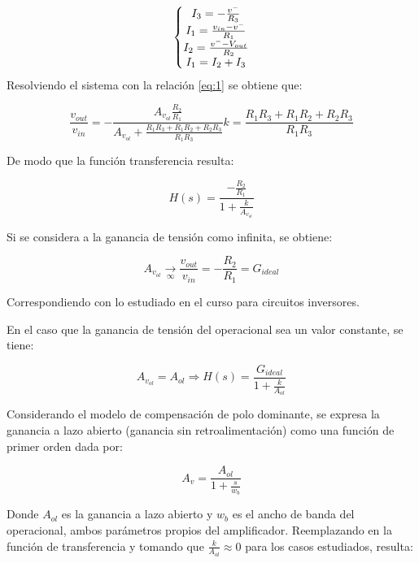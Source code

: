 \begin{equation}
\left\{\begin{matrix}

	$$I_{3}=-\frac{v^{-}}{R_{3}}$$
	
	\\ 
	$$I_{1}=\frac{v_{in}-v^{-}}{R_{1}}$$
	
	\\ 
	
	$$I_{2}=\frac{v^{-}-V_{out}}{R_{2}}$$
	
	\\ 
	
	$$I_{1}=I_{2}+I_{3}$$
	
	\end{matrix}\right.
\end{equation}
Resolviendo el sistema con la relación \ref{eq:1} se obtiene que:

\begin{equation} 
	\frac{v_{out}}{v_{in}}=-\frac{A_{v_{ol}}\frac{R_{2}}{R_{1}}}{A_{v_{ol}}+\frac{R_{1}R_{3}+R_{1}R_{2}+R_{2}R_{3}}{R_{1}R_{3}}}
    k=\frac{R_{1}R_{3}+R_{1}R_{2}+R_{2}R_{3}}{R_{1}R_{3}}
\end{equation}

De modo que la función transferencia resulta:

$$H(s)=\frac{-\frac{R_{2}}{R_{1}}}{1+\frac{k}{A_{v_{ol}}}}$$

Si se considera a la ganancia de tensión como infinita, se obtiene:

$$A_{v_{ol}}\underset{\infty }{\rightarrow} \frac{v_{out}}{v_{in}}=-\frac{R_{2}}{R_{1}}=G_{ideal}$$

Correspondiendo con lo estudiado en el curso para circuitos inversores. 

En el caso que la ganancia de tensión del operacional sea un valor constante, se tiene:

$$A_{v_{ol}}=A_{ol}\Rightarrow H(s)=\frac{G_{ideal}}{1+\frac{k}{A_{ol}}}$$

Considerando el modelo de compensación de polo dominante, se expresa la ganancia a lazo abierto (ganancia sin retroalimentación) como una función
de primer orden dada por:

$$A_{v} = \frac{A_{ol}}{1+\frac{s}{w_{b}}}$$

Donde $A_{ol}$ es la ganancia a lazo abierto y $w_{b}$ es el ancho de banda del operacional, ambos parámetros propios del amplificador. 
Reemplazando en la función de transferencia y tomando que $\frac{k}{A_{ol}}\approx 0$ para los casos estudiados, resulta:

